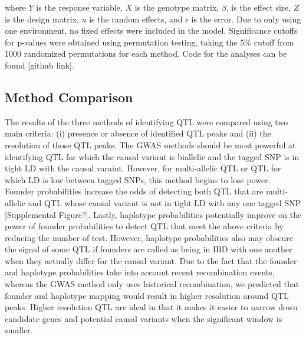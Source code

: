 \documentclass[article,9pt,twocolumn,twoside]{rilabRxiv}
\begin{document}
where $Y$ is the response variable, $X$ is the genotype matrix, $\beta$,
is the effect size, $Z$ is the design matrix, $u$ is the random
effects, and $\epsilon$ is the error. Due to only using one environment, no fixed
effects were included in the model. Significance cutoffs for p-values were
 obtained using permutation testing, taking the 5\% cutoff from 1000 randomized
  permutations for each method. Code for the analyses can be found [github link].

\subsection{Method Comparison}
The results of the three methods of identifying QTL were compared using two main
criteria: (i) presence or absence of identified QTL peaks and (ii) the resolution
of those QTL peaks. The GWAS methods should be most powerful at identifying QTL
for which the causal variant is biallelic and the tagged SNP is in tight LD with
the causal varaint. However, for multi-allelic QTL or QTL for which LD is low
between tagged SNPs, this method begins to lose power. Founder probabilities increase
the odds of detecting both QTL that are multi-allelic and QTL whose causal variant
is not in tight LD with any one tagged SNP [Supplemental Figure?]. Lastly,
haplotype probabilities potentially improve on the power of founder probabilities
to detect QTL that meet the above criteria by reducing the number of test. However,
haplotype probabilities also may obscure the signal of some QTL if founders are
called as being in IBD with one another when they actually differ for the causal
variant. Due to the fact that the founder and haplotype probabilities
take into account recent recombination events, whereas the GWAS method only uses
historical recombination, we predicted that founder and haplotype mapping would
result in higher resolution around QTL peaks. Higher resolution QTL are ideal in
that it makes it easier to narrow down candidate genes and potential causal variants
when the significant window is smaller.
\end{document}
